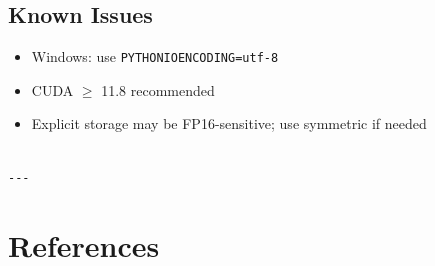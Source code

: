 \subsection{Known Issues}

\begin{itemize}
\item Windows: use \texttt{PYTHONIOENCODING=utf-8}
\item CUDA $\ge$ 11.8 recommended
\item Explicit storage may be FP16-sensitive; use symmetric if needed
\end{itemize}
\begin{lstlisting}

---
\end{lstlisting}


\section{References}

